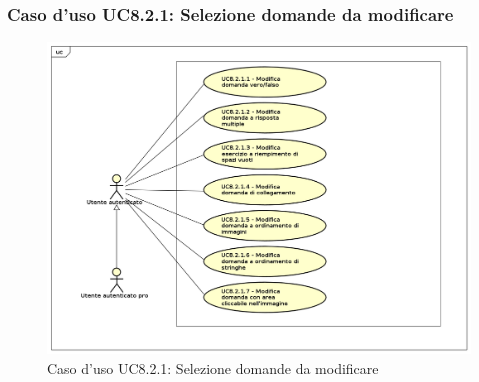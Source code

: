 		\subsubsection{Caso d'uso UC8.2.1: Selezione domande da modificare}
		\label{UC8.2.1}
		\begin{figure}[h]
			\centering
			\includegraphics[scale=0.5,keepaspectratio]{UML/UC8_2_1.png}
			\caption{Caso d'uso UC8.2.1: Selezione domande da modificare}
		\end{figure}
		\FloatBarrier
